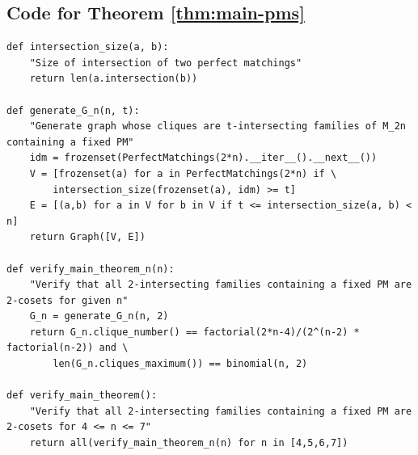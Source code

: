 \documentclass{article}
\theoremstyle{definition}
\begin{document}
\subsection{Code for Theorem \ref{thm:main-pms}} \label{apx:main-pms}

\begin{lstlisting}
def intersection_size(a, b):
    "Size of intersection of two perfect matchings"
    return len(a.intersection(b))

def generate_G_n(n, t):
    "Generate graph whose cliques are t-intersecting families of M_2n containing a fixed PM"
    idm = frozenset(PerfectMatchings(2*n).__iter__().__next__())
    V = [frozenset(a) for a in PerfectMatchings(2*n) if \
        intersection_size(frozenset(a), idm) >= t]
    E = [(a,b) for a in V for b in V if t <= intersection_size(a, b) < n]
    return Graph([V, E])

def verify_main_theorem_n(n):
    "Verify that all 2-intersecting families containing a fixed PM are 2-cosets for given n"
    G_n = generate_G_n(n, 2)
    return G_n.clique_number() == factorial(2*n-4)/(2^(n-2) * factorial(n-2)) and \
        len(G_n.cliques_maximum()) == binomial(n, 2)

def verify_main_theorem():
    "Verify that all 2-intersecting families containing a fixed PM are 2-cosets for 4 <= n <= 7"
    return all(verify_main_theorem_n(n) for n in [4,5,6,7])
\end{lstlisting}
\end{document}

